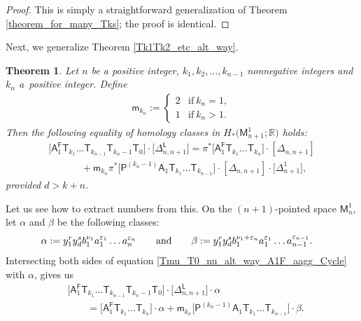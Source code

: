 \documentclass[pdftex]{sigma}
\numberwithin{equation}{section}
\newtheorem{thm}{Theorem}[section]
\begin{document}
\begin{proof} This is simply a straightforward generalization of Theorem \ref{theorem_for_many_Tks}; the proof is identical.
\end{proof}

Next, we generalize Theorem \ref{Tk1Tk2_etc_alt_way}.

\begin{thm}
\label{Tk1Tk2_etc_alt_way_A1F}
Let $n$ be a positive integer, $k_1, k_2, \dots , k_{n-1}$ nonnegative integers
and $k_n$ a~positive integer.
Define
\begin{align*}
\mathsf{m}_{k_n} := \begin{cases} 2 & \text{if} \ k_n=1, \\
1 & \text{if} \  k_n > 1.
\end{cases}
\end{align*}
Then the following equality of homology classes in $H_*\bigl(\mathsf{M}_{{n+1}}^1; \mathbb{R}\bigr)$ holds:
\begin{gather}
\bigl[\mathsf{A}_1^{\mathsf{F}} \mathsf{T}_{k_1} \dots \mathsf{T}_{k_{n-1}} \mathsf{T}_{k_n-1} \mathsf{T}_0\bigr] \cdot
\bigl[\Delta_{n, {n+1}}^{\mathsf{L}}\bigr]  = \pi^*\bigl[\mathsf{A}_1^{\mathsf{F}} \mathsf{T}_{k_1} \dots \mathsf{T}_{k_n}\bigr]\cdot [\Delta_{n, n+1}]   \nonumber \\
\phantom{ \qquad =}{} + \mathsf{m}_{k_n} \pi^{\ast} \bigl[\mathsf{P}^{(k_n-1)}\mathsf{A}_1 \mathsf{T}_{k_1} \dots \mathsf{T}_{k_{n-1}}\bigr]
\cdot [\Delta_{n,n+1}]\cdot \bigl[\Delta^1_{n+1}\bigr], \label{Tmu_T0_nu_alt_way_A1F_aagg_Cycle}
\end{gather}
provided $d > k+n$.
\end{thm}

\begin{rem}
 Let us see how to extract numbers from this.
On the $(n+1)$-pointed space $\mathsf{M}_{n}^1$, let $\alpha$ and $\beta$ be the following classes:
\begin{align*}
\alpha& := y_1^{r} y_d^s b_1^{\nu_{1}}a_1^{\varepsilon_{1}} \dots a_n^{\varepsilon_n}
\qquad \textnormal{and} \qquad \beta := y_1^{r} y_d^s b_1^{\nu_{1}+\varepsilon_n}
a_1^{\varepsilon_{1}} \dots a_{n-1}^{\varepsilon_{n-1}}.
\end{align*}
Intersecting both sides of equation \eqref{Tmu_T0_nu_alt_way_A1F_aagg_Cycle}
with $\alpha$, gives us
\begin{align*}%
&\bigl[\mathsf{A}_1^{\mathsf{F}} \mathsf{T}_{k_1} \dots \mathsf{T}_{k_{n-1}} \mathsf{T}_{k_n-1} \mathsf{T}_0\bigr] \cdot
\bigl[\Delta_{n, {n+1}}^{\mathsf{L}}\bigr]\cdot \alpha \\
&\qquad{} = \bigl[\mathsf{A}_1^{\mathsf{F}} \mathsf{T}_{k_1} \dots \mathsf{T}_{k_n}\bigr] \cdot \alpha
+ \mathsf{m}_{k_n} \bigl[\mathsf{P}^{(k_n-1)}\mathsf{A}_1 \mathsf{T}_{k_1} \dots \mathsf{T}_{k_{n-1}}\bigr]
\cdot \beta.
\end{align*}
\end{rem}
\end{document}
